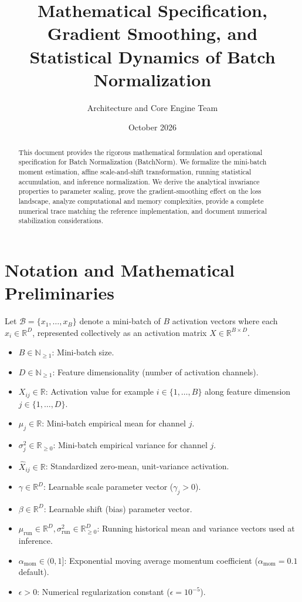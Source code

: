 \documentclass[11pt,a4paper]{article}
\title{\textbf{Mathematical Specification, Gradient Smoothing, and Statistical Dynamics of Batch Normalization}}
\author{Architecture and Core Engine Team}
\date{October 2026}
\theoremstyle{definition}
\begin{document}
\maketitle

\begin{abstract}
This document provides the rigorous mathematical formulation and operational specification for Batch Normalization (BatchNorm). We formalize the mini-batch moment estimation, affine scale-and-shift transformation, running statistical accumulation, and inference normalization. We derive the analytical invariance properties to parameter scaling, prove the gradient-smoothing effect on the loss landscape, analyze computational and memory complexities, provide a complete numerical trace matching the reference implementation, and document numerical stabilization considerations.
\end{abstract}

\section{Notation and Mathematical Preliminaries}

Let $\mathcal{B} = \{x_1, \dots, x_B\}$ denote a mini-batch of $B$ activation vectors where each $x_i \in \mathbb{R}^D$, represented collectively as an activation matrix $X \in \mathbb{R}^{B \times D}$.

\begin{itemize}
    \item $B \in \mathbb{N}_{\ge 1}$: Mini-batch size.
    \item $D \in \mathbb{N}_{\ge 1}$: Feature dimensionality (number of activation channels).
    \item $X_{ij} \in \mathbb{R}$: Activation value for example $i \in \{1, \dots, B\}$ along feature dimension $j \in \{1, \dots, D\}$.
    \item $\mu_j \in \mathbb{R}$: Mini-batch empirical mean for channel $j$.
    \item $\sigma_j^2 \in \mathbb{R}_{\ge 0}$: Mini-batch empirical variance for channel $j$.
    \item $\hat{X}_{ij} \in \mathbb{R}$: Standardized zero-mean, unit-variance activation.
    \item $\gamma \in \mathbb{R}^D$: Learnable scale parameter vector ($\gamma_j > 0$).
    \item $\beta \in \mathbb{R}^D$: Learnable shift (bias) parameter vector.
    \item $\mu_{\text{run}} \in \mathbb{R}^D, \sigma_{\text{run}}^2 \in \mathbb{R}^D_{\ge 0}$: Running historical mean and variance vectors used at inference.
    \item $\alpha_{\text{mom}} \in (0, 1]$: Exponential moving average momentum coefficient ($\alpha_{\text{mom}} = 0.1$ default).
    \item $\epsilon > 0$: Numerical regularization constant ($\epsilon = 10^{-5}$).
\end{itemize}
\end{document}

